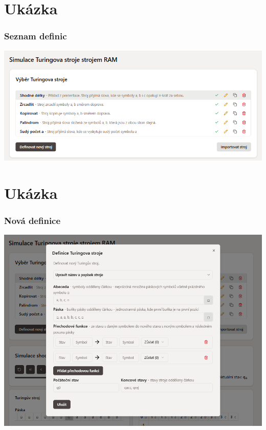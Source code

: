 \documentclass{beamer}
\begin{document}
\section{Ukázka}
\begin{frame}
	\frametitle{Seznam definic}
    \begin{center}
        \includegraphics[height=0.5\textheight]{fig/obr1.png}
    \end{center}
\end{frame}

\section{Ukázka}
\begin{frame}
	\frametitle{Nová definice}
    \begin{center}
        \includegraphics[height=0.85\textheight]{fig/obr2.png}
    \end{center}
\end{frame}
\end{document}
